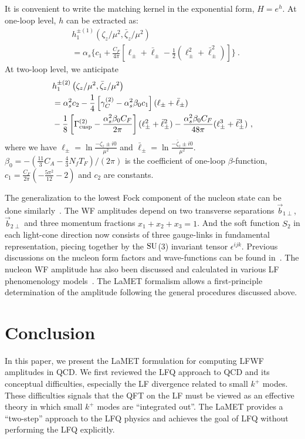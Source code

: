 \documentclass[twocolumn,superscriptaddress,longbibliography,10pt]{revtex4-1}
\begin{document}
It is convenient to write the matching kernel in the exponential form, $H=e^{h}$. At one-loop level, $h$ can be extracted as:
\begin{align}
& h_1^{\pm(1)}\left(\zeta_z/\mu^2,\bar \zeta_z/\mu^2\right)\nonumber \\
&=\alpha_s\Bigg\{ c_1+\frac{C_F}{4\pi}\left[\ell_{\pm}+\bar \ell_{\pm}-\frac{1}{2}(\ell_{\pm}^2+\bar \ell_{\pm}^2)\right]\Bigg\} \ .
\end{align}
At two-loop level, we anticipate
\begin{align}
& h_1^{\pm(2)}\left(\zeta_z/\mu^2,\bar \zeta_z/\mu^2\right)\\
&=\alpha_s^2 c_2-\frac{1}{4}\left[\gamma^{(2)}_C-\alpha_s^2\beta_0 c_1\right](\ell_{\pm}+\bar \ell_{\pm})\nonumber\\
&-\frac{1}{8}\left[\Gamma^{(2)}_{\rm cusp}-\frac{\alpha_s^2\beta_0 C_F}{2\pi}\right](\ell_{\pm}^2+\bar \ell_{\pm}^2)-\frac{\alpha_s^2\beta_0C_F}{48\pi}(\ell_{\pm}^3 +\bar \ell_{\pm}^3)\nonumber \ ,
\end{align}
where we have $\ell_{\pm}=\ln \frac{-\zeta_z\pm i0}{\mu^2}$ and $\bar \ell_{\pm}=\ln \frac{-\bar \zeta_z\pm i0}{\mu^2}$. $\beta_0=-\left(\frac{11}{3}C_A-\frac{4}{3}N_f T_F\right)/(2\pi)$ is the coefficient of one-loop $\beta$-function,  $c_1=\frac{C_F}{2\pi}\left(-\frac{5\pi^2}{12}-2\right)$ and $c_2$ are constants.

The generalization to the lowest Fock component of the nucleon state can be done similarly~\cite{Ji:2002xn}. The WF amplitudes depend on two transverse separations $\vec{b}_{1\perp}$, $\vec{b}_{2\perp}$ and three momentum fractions $x_1+x_2+x_3=1$. And the soft function $S_2$ in each light-cone direction now consists of three gauge-links in fundamental representation, piecing together by the ${\rm SU}$(3) invariant tensor $\epsilon^{ijk}$. Previous discussions on the nucleon form factors and wave-functions can be found in~\cite{Lepage:1979za,Duncan:1979hi,Aznaurian:1979zz,Sterman:1997sx,Li:1992ce}. The nucleon
WF amplitude has also been discussed and calculated in various LF phenomenology models~\cite{Mondal:2020mpv,Du:2019qsz}. The LaMET formalism allows a first-principle determination of the amplitude following the general procedures discussed above.

\section{Conclusion}

In this paper, we present the LaMET formulation for computing LFWF amplitudes in QCD. We first reviewed the LFQ approach to QCD and its conceptual difficulties, especially the LF divergence related to small $k^+$ modes. These difficulties signals that the QFT on the LF must be viewed as an effective theory in which small $k^+$ modes are ``integrated out''. The LaMET provides a ``two-step'' approach to the LFQ physics and achieves the goal of LFQ without performing the LFQ explicitly.
\end{document}
